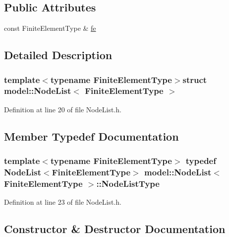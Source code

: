 \subsection*{Public Attributes}
\begin{DoxyCompactItemize}
\item 
const Finite\+Element\+Type \& \hyperlink{structmodel_1_1_node_list_a72754d71ac0dcf9e1836bba4ae1071f1}{fe}
\end{DoxyCompactItemize}


\subsection{Detailed Description}
\subsubsection*{template$<$typename Finite\+Element\+Type$>$struct model\+::\+Node\+List$<$ Finite\+Element\+Type $>$}



Definition at line 20 of file Node\+List.\+h.



\subsection{Member Typedef Documentation}
\hypertarget{structmodel_1_1_node_list_a75ab0962bbd6a25440cfccbc5458fd5f}{}
\subsubsection[{Node\+List\+Type}]{\setlength{\rightskip}{0pt plus 5cm}template$<$typename Finite\+Element\+Type$>$ typedef {\bf Node\+List}$<$Finite\+Element\+Type$>$ {\bf model\+::\+Node\+List}$<$ Finite\+Element\+Type $>$\+::{\bf Node\+List\+Type}}\label{structmodel_1_1_node_list_a75ab0962bbd6a25440cfccbc5458fd5f}


Definition at line 23 of file Node\+List.\+h.



\subsection{Constructor \& Destructor Documentation}
\hypertarget{structmodel_1_1_node_list_a63c6515a984f86f181910be861572676}{}
